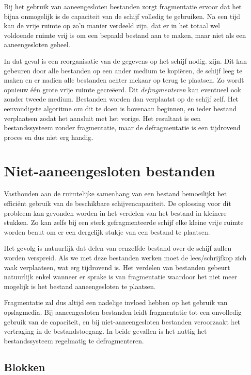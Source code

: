 Bij het gebruik van aaneengesloten bestanden zorgt fragmentatie
ervoor dat het bijna onmogelijk is de capaciteit van de schijf volledig
te gebruiken. Na een tijd kan de vrije ruimte op zo'n manier verdeeld
zijn, dat er in het totaal wel voldoende ruimte vrij is om een bepaald
bestand aan te maken, maar niet als een aaneengesloten geheel.

In dat geval is een reorganisatie van de gegevens op het schijf
nodig. zijn. Dit kan gebeuren door alle bestanden op een ander medium te
kopi\"eren, de schijf leeg te maken en er nadien alle bestanden achter
mekaar op terug te plaatsen. Zo wordt opnieuw \'e\'en grote vrije ruimte
gecre\"eerd. Dit \emph{defragmenteren} kan eventueel ook
zonder tweede medium. Bestanden worden dan verplaatst op de schijf zelf.
Het eenvoudigste algoritme om dit te doen is bovenaan beginnen, en ieder
bestand verplaatsen zodat het aansluit met het vorige. Het resultaat is
een bestandssysteem zonder fragmentatie, maar de defragmentatie is een
tijdrovend proces en dus niet erg handig.

\section{Niet-aaneengesloten bestanden}

Vasthouden aan de ruimtelijke samenhang van een bestand
bemoeilijkt het effici\"ent gebruik van de beschikbare schijvencapaciteit.
De oplossing voor dit probleem kan gevonden worden in het verdelen van
het bestand in kleinere stukken. Zo kan zelfs bij een sterk
gefragmenteerde schijf elke kleine vrije ruimte worden benut om er een
dergelijk stukje van een bestand te plaatsen.

Het gevolg is natuurlijk dat delen van eenzelfde bestand over de
schijf zullen worden verspreid. Als we met deze bestanden werken moet de
lees/schrijfkop zich vaak verplaatsen, wat erg tijdrovend is. Het
verdelen van bestanden gebeurt natuurlijk enkel wanneer er sprake is van
fragmentatie waardoor het niet meer mogelijk is het bestand
aaneengesloten te plaatsen.

Fragmentatie zal dus altijd een nadelige invloed hebben op het
gebruik van opslagmedia. Bij aaneengesloten bestanden leidt fragmentatie
tot een onvolledig gebruik van de capaciteit, en bij niet-aaneengesloten
bestanden veroorzaakt het vertraging in de bestandstoegang. In beide
gevallen is het nuttig het bestandssysteem regelmatig te
defragmenteren.

\subsection{Blokken}

